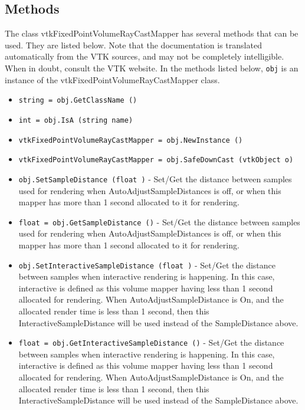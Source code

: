 \subsection{Methods}

The class vtkFixedPointVolumeRayCastMapper has several methods that can be used.
  They are listed below.
Note that the documentation is translated automatically from the VTK sources,
and may not be completely intelligible.  When in doubt, consult the VTK website.
In the methods listed below, \verb|obj| is an instance of the vtkFixedPointVolumeRayCastMapper class.
\begin{itemize}
\item  \verb|string = obj.GetClassName ()|

\item  \verb|int = obj.IsA (string name)|

\item  \verb|vtkFixedPointVolumeRayCastMapper = obj.NewInstance ()|

\item  \verb|vtkFixedPointVolumeRayCastMapper = obj.SafeDownCast (vtkObject o)|

\item  \verb|obj.SetSampleDistance (float )| -  Set/Get the distance between samples used for rendering 
 when AutoAdjustSampleDistances is off, or when this mapper
 has more than 1 second allocated to it for rendering.

\item  \verb|float = obj.GetSampleDistance ()| -  Set/Get the distance between samples used for rendering 
 when AutoAdjustSampleDistances is off, or when this mapper
 has more than 1 second allocated to it for rendering.

\item  \verb|obj.SetInteractiveSampleDistance (float )| -  Set/Get the distance between samples when interactive rendering is happening.
 In this case, interactive is defined as this volume mapper having less than 1
 second allocated for rendering. When AutoAdjustSampleDistance is On, and the
 allocated render time is less than 1 second, then this InteractiveSampleDistance
 will be used instead of the SampleDistance above.

\item  \verb|float = obj.GetInteractiveSampleDistance ()| -  Set/Get the distance between samples when interactive rendering is happening.
 In this case, interactive is defined as this volume mapper having less than 1
 second allocated for rendering. When AutoAdjustSampleDistance is On, and the
 allocated render time is less than 1 second, then this InteractiveSampleDistance
 will be used instead of the SampleDistance above.


\end{itemize}

